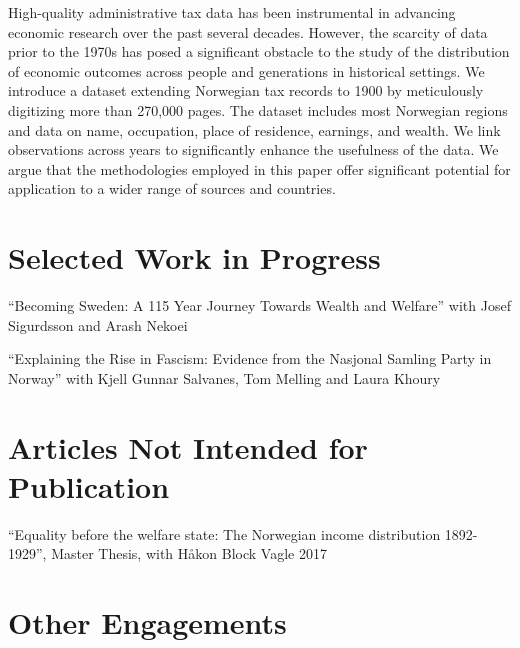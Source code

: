 \documentclass[11pt,]{article}
\begin{document}
High-quality administrative tax data has been instrumental in advancing
economic research over the past several decades. However, the scarcity
of data prior to the 1970s has posed a significant obstacle to the study
of the distribution of economic outcomes across people and generations
in historical settings. We introduce a dataset extending Norwegian tax
records to 1900 by meticulously digitizing more than 270,000 pages. The
dataset includes most Norwegian regions and data on name, occupation,
place of residence, earnings, and wealth. We link observations across
years to significantly enhance the usefulness of the data. We argue that
the methodologies employed in this paper offer significant potential for
application to a wider range of sources and
countries.\vspace{0.3cm}\vspace{-0.2cm}

\vspace{0.5cm}

\hypertarget{selected-work-in-progress}{%
\section{Selected Work in Progress}\label{selected-work-in-progress}}

``Becoming Sweden: A 115 Year Journey Towards Wealth and Welfare'' with
Josef Sigurdsson and Arash Nekoei\vspace{-0.2cm}

``Explaining the Rise in Fascism: Evidence from the Nasjonal Samling
Party in Norway'' with Kjell Gunnar Salvanes, Tom Melling and Laura
Khoury\vspace{-0.2cm}

\vspace{0.5cm}

\hypertarget{articles-not-intended-for-publication}{%
\section{Articles Not Intended for
Publication}\label{articles-not-intended-for-publication}}

``Equality before the welfare state: The Norwegian income distribution
1892-1929'', Master Thesis, with Håkon Block Vagle
\hfill 2017\vspace{-0.2cm}

\vspace{0.5cm}

\hypertarget{other-engagements}{%
\section{Other Engagements}\label{other-engagements}}
\end{document}
